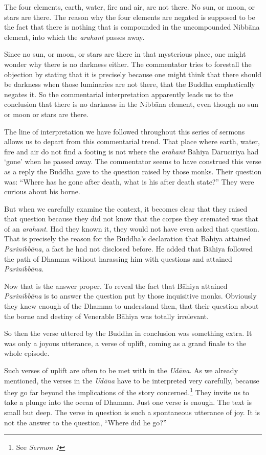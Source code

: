 The four elements, earth, water, fire and air, are not there. No sun, or moon, or stars are there. The reason why the four elements are negated is supposed to be the fact that there is nothing that is compounded in the uncompounded Nibbāna element, into which the \emph{arahant} passes away.

Since no sun, or moon, or stars are there in that mysterious place, one might wonder why there is no darkness either. The commentator tries to forestall the objection by stating that it is precisely because one might think that there should be darkness when those luminaries are not there, that the Buddha emphatically negates it. So the commentarial interpretation apparently leads us to the conclusion that there is no darkness in the Nibbāna element, even though no sun or moon or stars are there.

The line of interpretation we have followed throughout this series of sermons allows us to depart from this commentarial trend. That place where earth, water, fire and air do not find a footing is not where the \emph{arahant} Bāhiya Dārucīriya had `gone' when he passed away. The commentator seems to have construed this verse as a reply the Buddha gave to the question raised by those monks. Their question was: ``Where has he gone after death, what is his after death state?'' They were curious about his borne.

But when we carefully examine the context, it becomes clear that they raised that question because they did not know that the corpse they cremated was that of an \emph{arahant}. Had they known it, they would not have even asked that question. That is precisely the reason for the Buddha's declaration that Bāhiya attained \emph{Parinibbāna}, a fact he had not disclosed before. He added that Bāhiya followed the path of Dhamma without harassing him with questions and attained \emph{Parinibbāna}.

Now that is the answer proper. To reveal the fact that Bāhiya attained \emph{Parinibbāna} is to answer the question put by those inquisitive monks. Obviously they knew enough of the Dhamma to understand then, that their question about the borne and destiny of Venerable Bāhiya was totally irrelevant.

So then the verse uttered by the Buddha in conclusion was something extra. It was only a joyous utterance, a verse of uplift, coming as a grand finale to the whole episode.

Such verses of uplift are often to be met with in the \emph{Udāna}. As we already mentioned, the verses in the \emph{Udāna} have to be interpreted very carefully, because they go far beyond the implications of the story concerned.\footnote{See \emph{Sermon 1}} They invite us to take a plunge into the ocean of Dhamma. Just one verse is enough. The text is small but deep. The verse in question is such a spontaneous utterance of joy. It is not the answer to the question, ``Where did he go?''

